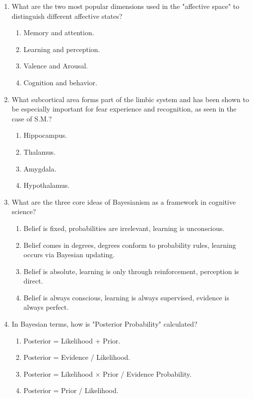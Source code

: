 \documentclass{article}
\begin{document}
\begin{enumerate}[label=\arabic*.]
\item What are the two most popular dimensions used in the "affective space" to distinguish different affective states?
\begin{enumerate}[label=(\alph*)]
    \item Memory and attention.
    \item Learning and perception.
    \item Valence and Arousal.
    \item Cognition and behavior.
\end{enumerate}

\item What subcortical area forms part of the limbic system and has been shown to be especially important for fear experience and recognition, as seen in the case of S.M.?
\begin{enumerate}[label=(\alph*)]
    \item Hippocampus.
    \item Thalamus.
    \item Amygdala.
    \item Hypothalamus.
\end{enumerate}

\item What are the three core ideas of Bayesianism as a framework in cognitive science?
\begin{enumerate}[label=(\alph*)]
    \item Belief is fixed, probabilities are irrelevant, learning is unconscious.
    \item Belief comes in degrees, degrees conform to probability rules, learning occurs via Bayesian updating.
    \item Belief is absolute, learning is only through reinforcement, perception is direct.
    \item Belief is always conscious, learning is always supervised, evidence is always perfect.
\end{enumerate}

\item In Bayesian terms, how is "Posterior Probability" calculated?
\begin{enumerate}[label=(\alph*)]
    \item Posterior = Likelihood + Prior.
    \item Posterior = Evidence / Likelihood.
    \item Posterior = Likelihood $\times$ Prior / Evidence Probability.
    \item Posterior = Prior / Likelihood.
\end{enumerate}


\end{enumerate}
\end{document}
